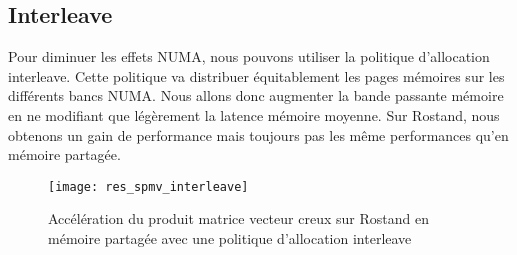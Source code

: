\subsection{Interleave}
Pour diminuer les effets NUMA, nous pouvons utiliser la politique d'allocation interleave.
%
Cette politique va distribuer équitablement les pages mémoires sur les différents bancs NUMA.
%
Nous allons donc augmenter la bande passante mémoire en ne modifiant que légèrement la latence mémoire moyenne.
%
Sur Rostand, nous obtenons un gain de performance mais toujours pas les même performances qu'en mémoire partagée.


\begin{figure}[t!]
  \centering
  \texttt{[image: res\_spmv\_interleave]}
  \caption{Accélération du produit matrice vecteur creux sur Rostand en mémoire partagée avec une politique d'allocation interleave}
  \label{fig:res_spmv_interleave_rostand}
\end{figure}
